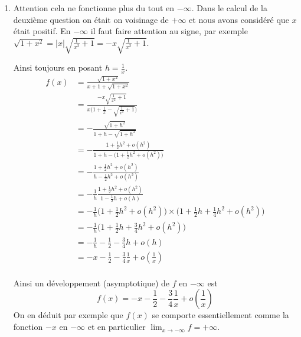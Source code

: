 {{\begin{enumerate}
  \item Attention cela ne fonctionne plus du tout en $-\infty$.
Dans le calcul de la deuxième question on était on voisinage de $+\infty$ et nous avons considéré que $x$ était positif.
En $-\infty$ il faut faire attention au signe, par exemple $\sqrt{1+x^2}= |x|\sqrt{\frac{1}{x^2}+1} = -x \sqrt{\frac{1}{x^2}+1}$.

Ainsi toujours en posant $h=\frac1x$.
\begin{align*}
f(x) 
  & = \frac{\sqrt{1+x^2}}{x+1+\sqrt{1+x^2}} \\
  & = \frac{-x\sqrt{\frac{1}{x^2}+1}}{x\big(1+\frac1x-\sqrt{\frac{1}{x^2}+1}\big)} \\
  & = -\frac{\sqrt{1+h^2}}{1+h-\sqrt{1+h^2}} \\
  & = -\frac{1+\frac12 h^2 + o(h^2)}{1+h - \big(1+\frac12 h^2 + o(h^2) \big)} \\
  & = - \frac{1+\frac12 h^2 + o(h^2)}{h  - \frac12 h^2 + o(h^2)} \\
  & = -\frac1h \frac{1+\frac12 h^2 + o(h^2)}{1 - \frac12 h + o(h)} \\
  & = -\frac1h \big(1+\frac12 h^2 + o(h^2)\big)\times\big(1+\frac12h +\frac14 h^2 + o(h^2) \big) \\
  & = -\frac1h\big(1 +\frac12h +\frac34 h^2 + o(h^2) \big) \\
  & =  -\frac1h -\frac12 -\frac34 h + o(h) \\
  & = -x -\frac12 -\frac34 \frac1x + o(\frac1x) \\
\end{align*}  

Ainsi un développement (asymptotique) de $f$ en $-\infty$ est 
$$f(x) = -x -\frac12 -\frac34 \frac1x + o(\frac1x)$$
On en déduit par exemple que $f(x)$ se comporte essentiellement comme la fonction $-x$
en $-\infty$ et en particulier $\lim_{x\to -\infty} f = +\infty$.
\end{enumerate}}
}